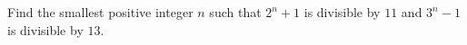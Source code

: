Find the smallest positive integer $n$ such that $2^n+1$ is divisible by $11$ and $3^n-1$ is divisible by $13$.
